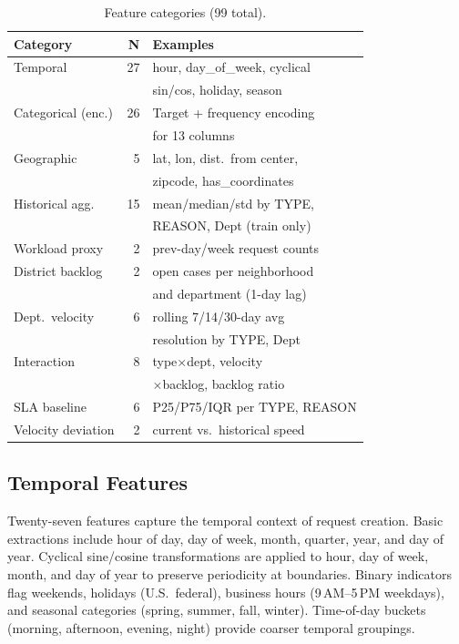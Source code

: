 \documentclass[sigconf,nonacm]{acmart}
\begin{document}
\begin{table}[t]
\caption{Feature categories (99 total).}
\label{tab:features}
\centering
\small
\begin{tabular}{lrl}
\toprule
\textbf{Category} & \textbf{N} & \textbf{Examples} \\
\midrule
Temporal           & 27 & hour, day\_of\_week, cyclical  \\
                   &    & sin/cos, holiday, season       \\
Categorical (enc.) & 26 & Target + frequency encoding    \\
                   &    & for 13 columns                 \\
Geographic         &  5 & lat, lon, dist.\ from center,  \\
                   &    & zipcode, has\_coordinates       \\
Historical agg.    & 15 & mean/median/std by TYPE,       \\
                   &    & REASON, Dept (train only)      \\
Workload proxy     &  2 & prev-day/week request counts   \\
District backlog   &  2 & open cases per neighborhood    \\
                   &    & and department (1-day lag)      \\
Dept.\ velocity    &  6 & rolling 7/14/30-day avg        \\
                   &    & resolution by TYPE, Dept       \\
Interaction        &  8 & type$\times$dept, velocity     \\
                   &    & $\times$backlog, backlog ratio \\
SLA baseline       &  6 & P25/P75/IQR per TYPE, REASON   \\
Velocity deviation &  2 & current vs.\ historical speed  \\
\bottomrule
\end{tabular}
\end{table}

\subsection{Temporal Features}

Twenty-seven features capture the temporal context of request
creation. Basic extractions include hour of day, day of week,
month, quarter, year, and day of year. Cyclical sine/cosine
transformations are applied to hour, day of week, month, and
day of year to preserve periodicity at boundaries. Binary indicators flag weekends, holidays (U.S.\
federal), business hours (9\,AM--5\,PM weekdays), and seasonal
categories (spring, summer, fall, winter). Time-of-day buckets
(morning, afternoon, evening, night) provide coarser temporal
groupings.
\end{document}
